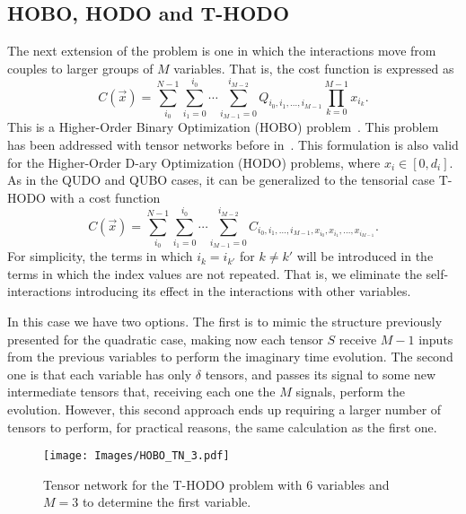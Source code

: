 \subsection{HOBO, HODO and T-HODO}
The next extension of the problem is one in which the interactions move from couples to larger groups of $M$ variables. That is, the cost function is expressed as
\begin{equation}\label{eq: cost HOBO}
    C(\vec{x})=\sum_{i_0}^{N-1}\sum_{i_1=0}^{i_0}\cdots \sum_{i_{M-1}=0}^{i_{M-2}} Q_{i_0, i_1, \dots, i_{M-1}}\prod_{k=0}^{M-1}x_{i_k}.
\end{equation}
This is a Higher-Order Binary Optimization (HOBO) problem~\cite{VQC_HOBO,HOBO_Quantum_2}. This problem has been addressed with tensor networks before in~\cite{HOBO_TN,HOBOTAN}. This formulation is also valid for the Higher-Order D-ary Optimization (HODO) problems, where $x_i\in [0,d_i]$. As in the QUDO and QUBO cases, it can be generalized to the tensorial case T-HODO with a cost function
\begin{equation}
    C(\vec{x})=\sum_{i_0}^{N-1}\sum_{i_1=0}^{i_0}\cdots \sum_{i_{M-1}=0}^{i_{M-2}} C_{i_0, i_1, \dots, i_{M-1}, x_{i_0}, x_{i_1}, \dots, x_{i_{M-1}}}.
\end{equation}
For simplicity, the terms in which $i_k=i_{k'}$ for $k\neq k'$ will be introduced in the terms in which the index values are not repeated. That is, we eliminate the self-interactions introducing its effect in the interactions with other variables.

In this case we have two options. The first is to mimic the structure previously presented for the quadratic case, making now each tensor $S$ receive $M-1$ inputs from the previous variables to perform the imaginary time evolution. The second one is that each variable has only $\delta$ tensors, and passes its signal to some new intermediate tensors that, receiving each one the $M$ signals, perform the evolution. However, this second approach ends up requiring a larger number of tensors to perform, for practical reasons, the same calculation as the first one.

\begin{figure}
    \centering
    \texttt{[image: Images/HOBO\_TN\_3.pdf]}
    \caption{Tensor network for the T-HODO problem with 6 variables and $M=3$ to determine the first variable.}
    \label{fig: T-HODO 3 TN}
\end{figure}

